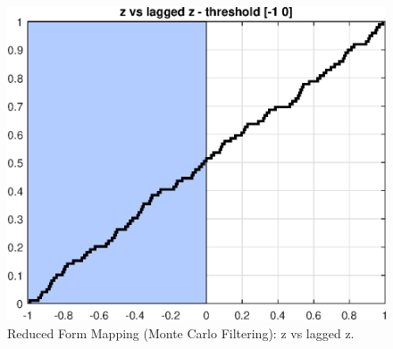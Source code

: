 
\begin{figure}[H]
\centering 
\includegraphics[width=1.00\textwidth]{RBC_kz/gsa/redform_prior/z_vs_z_threshold/RBC_kz_prior_z_vs_z}
\caption{Reduced Form Mapping (Monte Carlo Filtering): z vs lagged z.}\label{Fig:prior_z_vs_z}
\end{figure}

